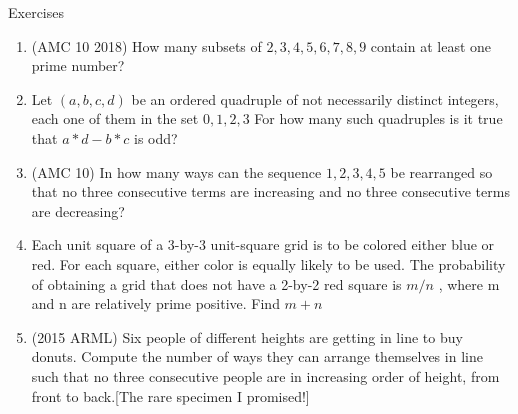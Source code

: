 \begin{xcb}{Exercises}
\begin{enumerate}
\begin{hint}
\end{hint}
\item(AMC 10 2018)  How many subsets of ${2, 3, 4, 5, 6, 7, 8, 9}$ contain at least one prime number?
\item {} Let $(a, b, c, d)$ be an ordered quadruple of not necessarily distinct integers, each one of them in the set $0, 1, 2, 3$ For how many such quadruples is it true that $a*d -b*c$ is odd?
\item (AMC 10)  In how many ways can the sequence $1, 2, 3, 4, 5$ be rearranged so that no three consecutive terms are increasing and no three consecutive terms are decreasing?
\item {} Each unit square of a 3-by-3 unit-square grid is to be colored either blue or red. For each square, either color is equally likely to be used. The probability of obtaining a grid that does not have a 2-by-2 red square is $m/n$ , where m and n are relatively prime positive. Find $m+n$
\begin{hint}
\end{hint}
\item      (2015 ARML)  Six people of different heights are getting in line to buy donuts. Compute the number of ways they can arrange themselves in line such that no three consecutive people are in increasing order of height, from front to back.[The rare specimen I promised!]
\begin{hint}
\end{hint}
\end{enumerate}
\end{xcb}
